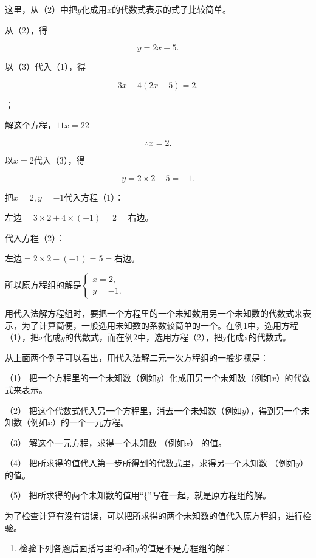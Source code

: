 这里，从（2）中把\(y\)化成用\(x\)的代数式表示的式子比较简单。

 从（2），得

\[
y = 2 x - 5. \tag{3}
\]

以（3）代入（1），得

\[
3 x + 4 (2 x - 5) = 2.
\]

；

解这个方程，\(11x = 22\)

\[
\therefore x = 2.
\]

以\(x = 2\)代入（3），得

\[
y = 2 \times 2 - 5 = - 1.
\]

 把\(x = 2, y = -1\)代入方程（1）：

左边\(= 3 \times 2 + 4 \times (-1) = 2 =\)右边。

代入方程（2）：

左边\(= 2 \times 2 - (-1) = 5 =\)右边。

所以原方程组的解是\(\left\{ \begin{array}{l} x = 2, \\ y = -1. \end{array} \right.\)

用代入法解方程组时，要把一个方程里的一个未知数用另一个未知数的代数式来表示，为了计算简便，一般选用未知数的系数较简单的一个。在例1中，选用方程（1），把\(x\)化成\(y\)的代数式，而在例2中，选用方程（2），把y化成x的代数式。

从上面两个例子可以看出，用代入法解二元一次方程组的一般步骤是：

（1）
把一个方程里的一个未知数（例如\(y\)）化成用另一个未知数（例如\(x\)）的代数式来表示。

（2）
把这个代数式代入另一个方程里，消去一个未知数（例如\(y\)），得到另一个未知数（例如\(x\)）的一个一元方程。

（3） 解这个一元方程，求得一个未知数 （例如\(x\)） 的值。

（4） 把所求得的值代入第一步所得到的代数式里，求得另一个未知数
（例如\(y\)） 的值。

（5） 把所求得的两个未知数的值用``\{''写在一起，就是原方程组的解。

为了检查计算有没有错误，可以把所求得的两个未知数的值代入原方程组，进行检验。

\begin{enumerate}
\item
  检验下列各题后面括号里的\(x\)和\(y\)的值是不是方程组的解：
\end{enumerate}


